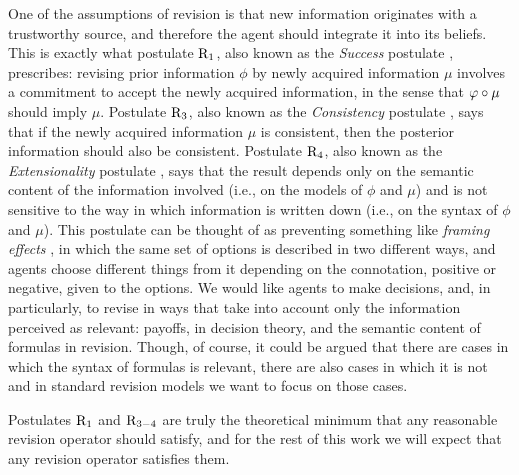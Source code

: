 One of the assumptions of revision is that new information 
originates with a trustworthy source, 
and therefore the agent should integrate it into its beliefs.
This is exactly what postulate $\mathrm{R}_{1}$, 
also known as the \emph{Success} postulate \cite{FermeH18}, prescribes:
revising prior information $\phi$ by newly acquired information $\mu$ 
involves a commitment to accept 
the newly acquired information, in the sense that $\varphi\circ\mu$ should imply $\mu$.
Postulate $\mathrm{R}_{3}$, also known as the \emph{Consistency} postulate \cite{FermeH18}, 
says that if the newly acquired information $\mu$ is consistent, 
then the posterior information should also be consistent.
Postulate $\mathrm{R}_{4}$, also known as the \emph{Extensionality} postulate \cite{FermeH18}, 
says that the result depends only 
on the semantic content of the information involved 
(i.e., on the models of $\phi$ and $\mu$) 
and is not sensitive to the way in which information is written down 
(i.e., on the syntax of $\phi$ and $\mu$).
This postulate can be thought of as preventing something like 
\emph{framing effects} \cite{TverskyK81,Kahneman11},
in which the same set of options is described in two different ways,
and agents choose different things from it depending on the connotation,
positive or negative, given to the options.
We would like agents to make decisions, and, in particularly, to revise
in ways that take into account only the information perceived as relevant:
payoffs, in decision theory, and the semantic content of formulas in revision.
Though, of course, it could be argued that there are cases in which the syntax 
of formulas is relevant, there are also cases in which it is not
and in standard revision models we want to focus on those cases.

Postulates $\mathrm{R}_{1}$ and $\mathrm{R}_{3-4}$ are truly the theoretical minimum 
that any reasonable revision operator should satisfy,
and for the rest of this work we will expect that any revision operator satisfies them.

